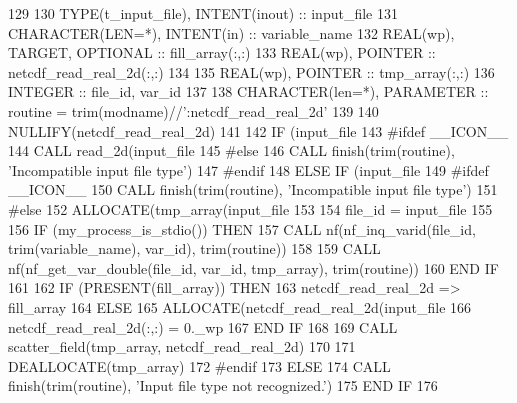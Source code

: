 \begin{DoxyCode}
129 
130     \textcolor{keywordtype}{TYPE}(t\_input\_file), \textcolor{keywordtype}{INTENT(inout)} :: input\_file
131     \textcolor{keywordtype}{CHARACTER(LEN=*)},   \textcolor{keywordtype}{INTENT(in)}    :: variable\_name
132     \textcolor{keywordtype}{REAL(wp)}, \textcolor{keywordtype}{TARGET}, \textcolor{keywordtype}{OPTIONAL}        :: fill\_array(:,:)
133     \textcolor{keywordtype}{REAL(wp)}, \textcolor{keywordtype}{POINTER}                 :: netcdf\_read\_real\_2d(:,:)
134 
135     \textcolor{keywordtype}{REAL(wp)}, \textcolor{keywordtype}{POINTER} :: tmp\_array(:,:)
136     \textcolor{keywordtype}{INTEGER} :: file\_id, var\_id
137 
138     \textcolor{keywordtype}{CHARACTER(len=*)}, \textcolor{keywordtype}{PARAMETER} :: routine = trim(modname)//\textcolor{stringliteral}{':netcdf\_read\_real\_2d'}
139 
140     \textcolor{keyword}{NULLIFY}(netcdf\_read\_real\_2d)
141 
142     \textcolor{keywordflow}{IF} (input\_file%
143 \textcolor{preprocessor}{#ifdef \_\_ICON\_\_}
144 \textcolor{preprocessor}{}      \textcolor{keyword}{CALL }read\_2d(input\_file%
145 \textcolor{preprocessor}{#else}
146 \textcolor{preprocessor}{}      \textcolor{keyword}{CALL }finish(trim(routine), \textcolor{stringliteral}{'Incompatible input file type'})
147 \textcolor{preprocessor}{#endif}
148 \textcolor{preprocessor}{}    \textcolor{keywordflow}{ELSE} \textcolor{keywordflow}{IF} (input\_file%
149 \textcolor{preprocessor}{#ifdef \_\_ICON\_\_}
150 \textcolor{preprocessor}{}      \textcolor{keyword}{CALL }finish(trim(routine), \textcolor{stringliteral}{'Incompatible input file type'})
151 \textcolor{preprocessor}{#else}
152 \textcolor{preprocessor}{}      \textcolor{keyword}{ALLOCATE}(tmp\_array(input\_file%
153 
154       file\_id = input\_file%
155 
156       \textcolor{keywordflow}{IF} (my\_process\_is\_stdio()) \textcolor{keywordflow}{THEN}
157         \textcolor{keyword}{CALL }nf(nf\_inq\_varid(file\_id, trim(variable\_name), var\_id), trim(routine))
158 
159         \textcolor{keyword}{CALL }nf(nf\_get\_var\_double(file\_id, var\_id, tmp\_array), trim(routine))
160 \textcolor{keywordflow}{      END IF}
161 
162       \textcolor{keywordflow}{IF} (\textcolor{keyword}{PRESENT}(fill\_array)) \textcolor{keywordflow}{THEN}
163         netcdf\_read\_real\_2d => fill\_array
164       \textcolor{keywordflow}{ELSE}
165         \textcolor{keyword}{ALLOCATE}(netcdf\_read\_real\_2d(input\_file%
166         netcdf\_read\_real\_2d(:,:) = 0.\_wp
167 \textcolor{keywordflow}{      END IF}
168 
169       \textcolor{keyword}{CALL }scatter\_field(tmp\_array, netcdf\_read\_real\_2d)
170 
171       \textcolor{keyword}{DEALLOCATE}(tmp\_array)
172 \textcolor{preprocessor}{#endif}
173 \textcolor{preprocessor}{}    \textcolor{keywordflow}{ELSE}
174       \textcolor{keyword}{CALL }finish(trim(routine), \textcolor{stringliteral}{'Input file type not recognized.'})
175 \textcolor{keywordflow}{    END IF}
176 
\end{DoxyCode}


